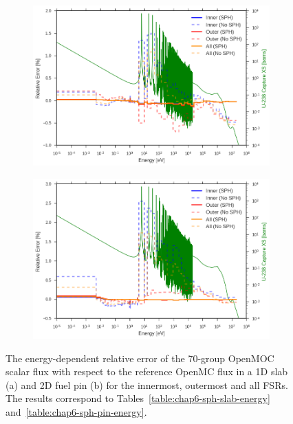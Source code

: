 \begin{figure}[h!]
\begin{subfigure}{.9\textwidth}
  \centering
  \includegraphics[width=\linewidth]{figures/sph/slab/rel-err-inner-outer}
  \caption{}
\end{subfigure}
\begin{subfigure}{.9\textwidth}
  \centering
  \includegraphics[width=\linewidth]{figures/sph/pin-cell/rel-err-inner-outer}
  \caption{}
\end{subfigure}
\caption[Flux relative error by energy group with SPH]{The energy-dependent relative error of the 70-group OpenMOC scalar flux with respect to the reference OpenMC flux in a 1D slab (a) and 2D fuel pin (b) for the innermost, outermost and all \ac{FSR}s. The results correspond to Tables~\ref{table:chap6-sph-slab-energy} and~\ref{table:chap6-sph-pin-energy}.}
\label{fig:chap6-rel-err-energy}
\end{figure}

